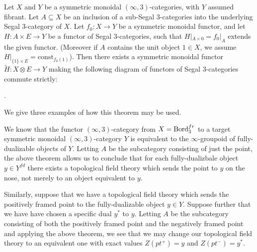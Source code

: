 \documentclass{amsart}
\begin{document}
\begin{theorem}
	Let $X$ and $Y$ be a symmetric monoidal $(\infty, 3)$-categories, with $Y$ assumed fibrant. Let  $A \subseteq X$ be an inclusion of a sub-Segal 3-categories into the underlying Segal $3$-category of $X$. Let $f_0: X \to Y$ be a symmetric monoidal functor, and let $H: A \times E \to Y$ be a functor of Segal 3-categories, such that $H |_{A \times 0} = f_0|_{A}$ extends the given functor. (Moreover if $A$ contains the unit object $1 \in X$, we assume $H|_{\{1\} \times E} = \textrm{const}_{f_0(1)}$). Then there exists a symmetric monoidal functor $\tilde{H}: X \otimes E \to Y$ making the following diagram of functors of Segal 3-categories commute strictly:
	\begin{center}
	.
	\end{center}
\end{theorem}

We give three examples of how this theorem may be used. 

\begin{example}
	We know that the functor $(\infty,3)$-category from $X = \mathrm{Bord}_3^{fr}$ to a target symmetric monoidal $(\infty,3)$-category $Y$ is equivalent to the $\infty$-groupoid of fully-dualizable objects of $Y$. Letting $A$ be the subcategory consisting of just the point, the above theorem allows us to conclude that for each fully-dualizbale object $y \in Y^{fd}$ there exists a topological field theory which sends the point to $y$ on the nose, not merely to an object equivalent to $y$. 
\end{example}

\begin{example}	
	Similarly, suppose that we have a topological field theory which sends the positively framed point to the fully-dualizable object $y \in Y$. Suppose further that we have have chosen a specific dual $y^*$ to $y$. Letting $A$ be the subcategory consisting of both the positively framed point and the negatively framed point and applying the above theorem, we see that we may change our topological field theory to an equivalent one with exact values $Z(pt^+) = y$ and $Z(pt^-) = y^*$.   
\end{example}	
\end{document}
